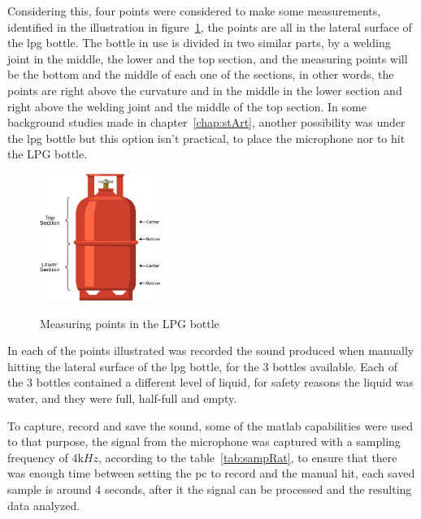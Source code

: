 Considering this, four points were considered to make some measurements, identified in the illustration in figure~\ref{fig:measPointMic}, the points are all in the lateral surface of the \acrshort{lpg} bottle. The bottle in use is divided in two similar parts, by a welding joint in the middle, the lower and the top section, and the measuring points will be the bottom and the middle of each one of the sections, in other words, the points are right above the curvature and in the middle in the lower section and right above the welding joint and the middle of the top section. In some background studies made in chapter~\ref{chap:stArt}, another possibility was under the \acrshort{lpg} bottle but this option isn't practical, to place the microphone nor to hit the LPG bottle.
\begin{figure}[]
    \centering
    \includegraphics[width=0.35\textwidth]{Chapters/6CHP/Figures/measuringPointsMic.eps}
    \caption{Measuring points in the LPG bottle}{}
    \label{fig:measPointMic}
\end{figure}
In each of the points illustrated was recorded the sound produced when manually hitting the lateral surface of the \acrshort{lpg} bottle, for the 3 bottles available. Each of the 3 bottles contained a different level of liquid, for safety reasons the liquid was water, and they were full, half-full and empty. 

To capture, record and save the sound, some of the \acrshort{matlab} capabilities were used to that purpose, the signal from the microphone was captured with a sampling frequency of 4k$Hz$, according to the table~\ref{tab:sampRat}, to ensure that there was enough time between setting the \acrshort{pc} to record and the manual hit, each saved sample is around 4 seconds, after it the signal can be processed and the resulting data analyzed.
